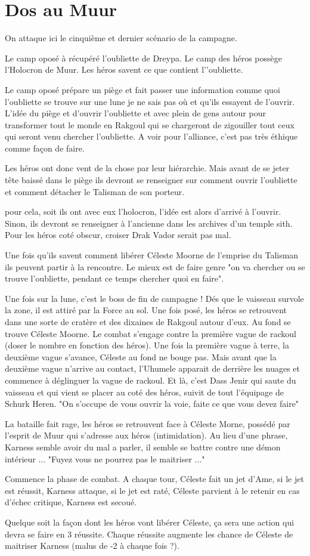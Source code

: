 \section{Dos au Muur}

On attaque ici le cinquième et dernier scénario de la campagne.

Le camp oposé à récupéré l’oubliette de Dreypa.
Le camp des héros possège l’Holocron de Muur.
Les héros savent ce que contient l'’oubliette.

Le camp oposé prépare un piège et fait passer une information comme quoi l’oubliette se trouve sur une lune je ne sais pas où et qu'ils essayent de l’ouvrir. L’idée du piège et d’ouvrir l’oubliette et avec plein de gens autour pour transformer tout le monde en Rakgoul qui se chargeront de zigouiller tout ceux qui seront venu chercher l’oubliette.
A voir pour l’alliance, c'est pas très éthique comme façon de faire.

Les héros ont donc vent de la chose par leur hiérarchie. Mais avant de se jeter tête baissé dans le piège ils devront se renseigner sur comment ouvrir l'oubliette et comment détacher le Talisman de son porteur.

pour cela, soit ils ont avec eux l'holocron, l'idée est alors d'arrivé à l'ouvrir. Sinon, ils devront se renseigner à l'ancienne dans les archives d'un temple sith. Pour les héros coté obscur, croiser Drak Vador serait pas mal.

Une fois qu'ils savent comment libérer Céleste Moorne de l'emprise du Talisman ils peuvent partir à la rencontre. Le mieux est de faire genre "on va chercher ou se trouve l'oubliette, pendant ce temps chercher quoi en faire".


Une fois sur la lune, c'est le boss de fin de campagne !
Dés que le vaisseau survole la zone, il est attiré par la Force au sol. Une fois posé, les héros se retrouvent dans une sorte de cratère et des dixaines de Rakgoul autour d'eux. Au fond se trouve Céleste Moorne. Le combat s'engage contre la première vague de rackoul (doser le nombre en fonction des héros). Une fois la première vague à terre, la deuxième vague s'avance, Céleste au fond ne bouge pas.
Mais avant que la deuxième vague n'arrive au contact, l'Uhumele apparait de derrière les nuages et commence à déglinguer la vague de rackoul. Et là, c'est Dass Jenir qui saute du vaisseau et qui vient se placer au coté des héros, suivit de tout l'équipage de Schurk Heren. "On s'occupe de vous ouvrir la voie, faite ce que vous devez faire"

La bataille fait rage, les héros se retrouvent face à Céleste Morne, possédé par l'esprit de Muur qui s'adresse aux héros (intimidation). Au lieu d'une phrase, Karness semble avoir du mal a parler, il semble se battre contre une démon intérieur ... "Fuyez vous ne pourrez pas le maitriser ..."

Commence la phase de combat. A chaque tour, Céleste fait un jet d'Ame, si le jet est réussit, Karness attaque, si le jet est raté, Céleste parvient à le retenir en cas d'échec critique, Karness est secoué.

Quelque soit la façon dont les héros vont libérer Céleste, ça sera une action qui devra se faire en 3 réussite. Chaque réussite augmente les chance de Céleste de maitriser Karness (malus de -2 à chaque fois ?). 